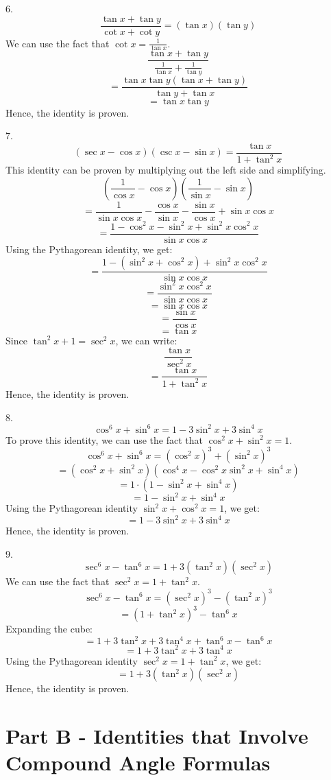 \documentclass{article}
\begin{document}
\vspace{2em}
6. $$\frac{\tan x + \tan y}{\cot x + \cot y} = (\tan x)(\tan y)$$
   We can use the fact that \(\cot x = \frac{1}{\tan x}\).
   \[\frac{\tan x + \tan y}{\frac{1}{\tan x} + \frac{1}{\tan y}}\]
   \[= \frac{\tan x \tan y (\tan x + \tan y)}{\tan y + \tan x}\]
   \[= \tan x \tan y\]
   Hence, the identity is proven.

\vspace{2em}
7. $$(\sec x - \cos x)(\csc x - \sin x) = \frac{\tan x}{1 + \tan^2 x}$$
   This identity can be proven by multiplying out the left side and simplifying.
   \[(\frac{1}{\cos x} - \cos x)(\frac{1}{\sin x} - \sin x)\]
   \[= \frac{1}{\sin x \cos x} - \frac{\cos x}{\sin x} - \frac{\sin x}{\cos x} + \sin x \cos x\]
   \[= \frac{1 - \cos^2 x - \sin^2 x + \sin^2 x \cos^2 x}{\sin x \cos x}\]
   Using the Pythagorean identity, we get:
   \[= \frac{1 - (\sin^2 x + \cos^2 x) + \sin^2 x \cos^2 x}{\sin x \cos x}\]
   \[= \frac{\sin^2 x \cos^2 x}{\sin x \cos x}\]
   \[= \sin x \cos x\]
   \[= \frac{\sin x}{\cos x}\]
   \[= \tan x\]
   Since \(\tan^2 x + 1 = \sec^2 x\), we can write:
   \[\frac{\tan x}{\sec^2 x}\]
   \[= \frac{\tan x}{1 + \tan^2 x}\]
   Hence, the identity is proven.
   
\vspace{2em}
8. $$\cos^6 x + \sin^6 x = 1 - 3 \sin^2 x + 3 \sin^4 x$$
   To prove this identity, we can use the fact that \(\cos^2 x + \sin^2 x = 1\).
   \[\cos^6 x + \sin^6 x = (\cos^2 x)^3 + (\sin^2 x)^3\]
   \[= (\cos^2 x + \sin^2 x)(\cos^4 x - \cos^2 x \sin^2 x + \sin^4 x)\]
   \[= 1 \cdot (1 - \sin^2 x + \sin^4 x)\]
   \[= 1 - \sin^2 x + \sin^4 x\]
   Using the Pythagorean identity \(\sin^2 x + \cos^2 x = 1\), we get:
   \[= 1 - 3\sin^2 x + 3\sin^4 x\]
   Hence, the identity is proven.

\vspace{2em}
9. $$\sec^6 x - \tan^6 x = 1 + 3(\tan^2 x)(\sec^2 x)$$
   We can use the fact that \(\sec^2 x = 1 + \tan^2 x\).
   \[\sec^6 x - \tan^6 x = (\sec^2 x)^3 - (\tan^2 x)^3\]
   \[= (1 + \tan^2 x)^3 - \tan^6 x\]
   Expanding the cube:
   \[= 1 + 3\tan^2 x + 3\tan^4 x + \tan^6 x - \tan^6 x\]
   \[= 1 + 3\tan^2 x + 3\tan^4 x\]
   Using the Pythagorean identity \(\sec^2 x = 1 + \tan^2 x\), we get:
   \[= 1 + 3(\tan^2 x)(\sec^2 x)\]
   Hence, the identity is proven.
   
\vspace{2em}
\section*{Part B - Identities that Involve Compound Angle Formulas}
\end{document}
